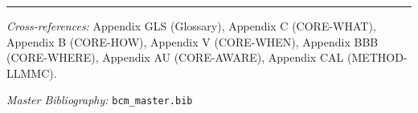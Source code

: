 \nocite{bcm_master}


\vspace{1em}
\hrule
\vspace{0.5em}

\noindent\textit{Cross-references:}
Appendix GLS (Glossary),
Appendix C (CORE-WHAT),
Appendix B (CORE-HOW),
Appendix V (CORE-WHEN),
Appendix BBB (CORE-WHERE),
Appendix AU (CORE-AWARE),
Appendix CAL (METHOD-LLMMC).

\noindent\textit{Master Bibliography:} \texttt{bcm\_master.bib}

